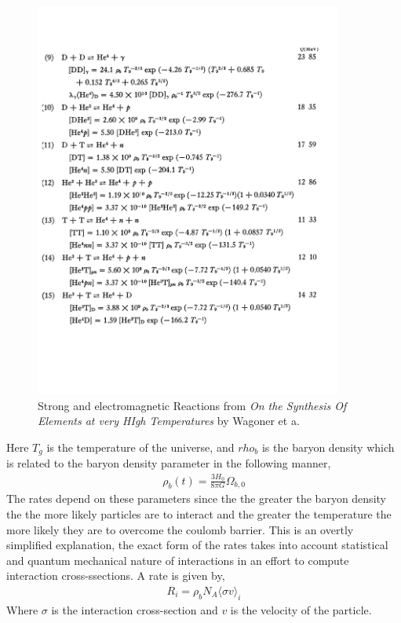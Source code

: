\documentclass[twoside]{article}
\begin{document}
\begin{figure}[h!]
  \centering
	\includegraphics[width=0.9\textwidth]{eqs2.pdf}
  \caption{Strong and electromagnetic Reactions from \emph{On the Synthesis Of Elements at very HIgh Temperatures} by Wagoner et a. }\label{f:reactions2}
\end{figure}
\newpage

Here $T_{g}$ is the temperature of the universe, and $rho_{b}$ is the baryon density which is related to the baryon density parameter in the following manner,
\begin{align}
\rho_{b}(t) = \frac{3H_{0}}{8\pi G}\Omega_{b,0}
\end{align}
The rates depend on these parameters since the the greater the baryon density the  the more likely particles are to interact and the greater the temperature the more likely they are to overcome the coulomb barrier. This is an overtly simplified explanation, the exact form of the rates takes into account statistical and quantum mechanical nature of interactions in an effort to compute interaction cross-ssections. A rate is given by,
\begin{align}
R_{i} = \rho_{b}N_{A}\langle\sigma v\rangle_{i}
\end{align}
Where $\sigma$ is the interaction cross-section and $v$ is the velocity of the particle.





\end{document}
